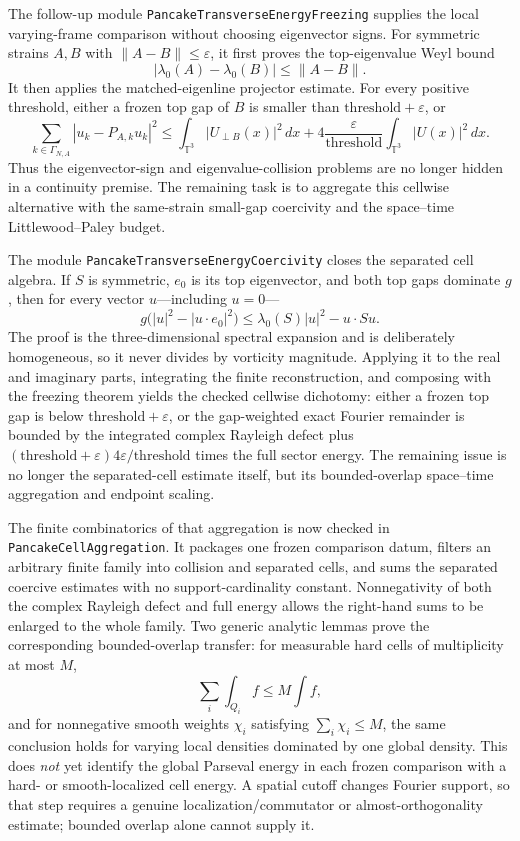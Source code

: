 \documentclass[11pt]{article}
\theoremstyle{definition}
\begin{document}
The follow-up module \texttt{PancakeTransverseEnergyFreezing} supplies the
local varying-frame comparison without choosing eigenvector signs.  For
symmetric strains $A,B$ with $\|A-B\|\leq\varepsilon$, it first proves the
top-eigenvalue Weyl bound
\[
  |\lambda_0(A)-\lambda_0(B)|\leq\|A-B\|.
\]
It then applies the matched-eigenline projector estimate.  For every positive
threshold, either a frozen top gap of $B$ is smaller than
$\text{threshold}+\varepsilon$, or
\[
  \sum_{k\in\Gamma_{N,A}} |u_k-P_{A,k}u_k|^2
  \leq \int_{\mathbb T^3}|U_{\perp B}(x)|^2\,dx
    +4\frac{\varepsilon}{\text{threshold}}
       \int_{\mathbb T^3}|U(x)|^2\,dx .
\]
Thus the eigenvector-sign and eigenvalue-collision problems are no longer
hidden in a continuity premise.  The remaining task is to aggregate this
cellwise alternative with the same-strain small-gap coercivity and the
space--time Littlewood--Paley budget.

The module \texttt{PancakeTransverseEnergyCoercivity} closes the separated
cell algebra.  If $S$ is symmetric, $e_0$ is its top eigenvector, and both top
gaps dominate $g$, then for every vector $u$---including $u=0$---
\[
 g\bigl(|u|^2-|u\mathbin{\cdot}e_0|^2\bigr)
 \leq \lambda_0(S)|u|^2-u\mathbin{\cdot}Su.
\]
The proof is the three-dimensional spectral expansion and is deliberately
homogeneous, so it never divides by vorticity magnitude.  Applying it to the
real and imaginary parts, integrating the finite reconstruction, and
composing with the freezing theorem yields the checked cellwise dichotomy:
either a frozen top gap is below $\mathrm{threshold}+\varepsilon$, or the
gap-weighted exact Fourier remainder is bounded by the integrated complex
Rayleigh defect plus
$(\mathrm{threshold}+\varepsilon)4\varepsilon/\mathrm{threshold}$ times the
full sector energy.  The remaining issue is no longer the separated-cell
estimate itself, but its bounded-overlap space--time aggregation and endpoint
scaling.

The finite combinatorics of that aggregation is now checked in
\texttt{PancakeCellAggregation}.  It packages one frozen comparison datum,
filters an arbitrary finite family into collision and separated cells, and
sums the separated coercive estimates with no support-cardinality constant.
Nonnegativity of both the complex Rayleigh defect and full energy allows the
right-hand sums to be enlarged to the whole family.  Two generic analytic
lemmas prove the corresponding bounded-overlap transfer: for measurable hard
cells of multiplicity at most $M$,
\[
  \sum_i\int_{Q_i}f\leq M\int f,
\]
and for nonnegative smooth weights $\chi_i$ satisfying
$\sum_i\chi_i\leq M$, the same conclusion holds for varying local densities
dominated by one global density.  This does \emph{not} yet identify the
global Parseval energy in each frozen comparison with a hard- or
smooth-localized cell energy.  A spatial cutoff changes Fourier support, so
that step requires a genuine localization/commutator or almost-orthogonality
estimate; bounded overlap alone cannot supply it.
\end{document}
